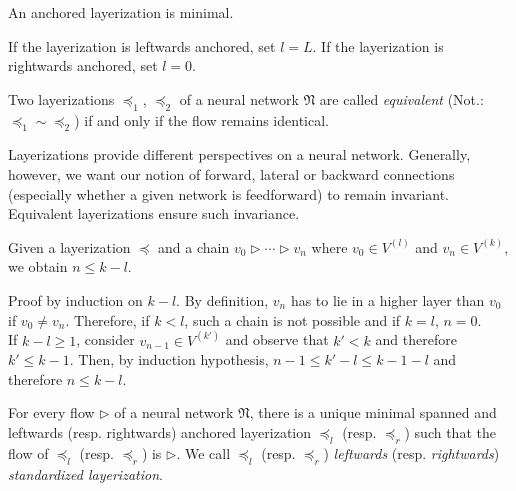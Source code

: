\documentclass[a4paper,11pt]{report}
\begin{document}
\begin{Lem}
An anchored layerization is minimal.
\end{Lem}

\begin{Bew}
If the layerization is leftwards anchored, set $l=L$. If the layerization is rightwards anchored, set $l=0$.
\end{Bew}

\begin{Def}\label{def:layerization-equivalence}
Two layerizations $\preceq_1$, $\preceq_2$ of a neural network $\mathfrak{N}$ are called \emph{equivalent} (Not.: $\preceq_1\sim\preceq_2$) if and only if the flow remains identical.
\end{Def}

\begin{Par}
Layerizations provide different perspectives on a neural network. Generally, however, we want our notion of forward, lateral or backward connections (especially whether a given network is feedforward) to remain invariant. Equivalent layerizations ensure such invariance.
\end{Par}

\begin{Lem}\label{lem:depth}
Given a layerization $\preceq$ and a chain $v_0\triangleright\dotsb \triangleright v_n$ where $v_0\in V^{(l)}$ and $v_n\in V^{(k)}$, we obtain $n\le k-l$.
\end{Lem}

\begin{Bew}
Proof by induction on $k-l$. By definition, $v_n$ has to lie in a higher layer than $v_0$ if $v_0\ne v_n$. Therefore, if $k<l$, such a chain is not possible and if $k=l$, $n=0$.\\
If $k-l\ge 1$, consider $v_{n-1}\in V^{(k')}$ and observe that $k'<k$ and therefore $k'\le k-1$. Then, by induction hypothesis, $n-1\le k'-l\le k-1-l$ and therefore $n\le k-l$. 
\end{Bew}

\begin{The}\label{the:standardized-layerization}
For every flow $\triangleright$ of a neural network $\mathfrak{N}$, there is a unique minimal spanned and leftwards (resp. rightwards) anchored layerization $\preceq_l$ (resp. $\preceq_r$) such that the flow of $\preceq_l$ (resp. $\preceq_r$) is $\triangleright$. We call $\preceq_l$ (resp. $\preceq_r$) \emph{leftwards} (resp. \emph{rightwards}) \emph{standardized layerization}.
\end{The}
\end{document}
